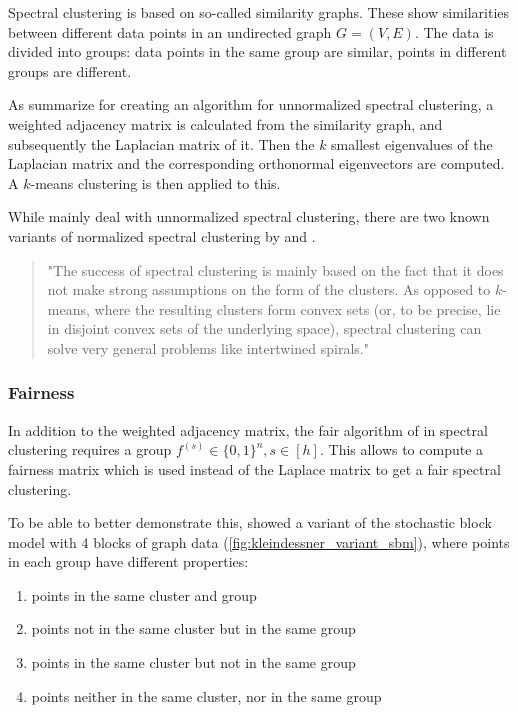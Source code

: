 Spectral clustering is based on so-called similarity graphs. These show similarities between different data points in an undirected graph $G = (V,E)$. The data is divided into groups: data points in the same group are similar, points in different groups are different. \autocite[2]{VonLuxburg2007}

As \textcite[2]{Kleindessner2019} summarize for creating an algorithm for unnormalized spectral clustering, a weighted adjacency matrix is calculated from the similarity graph, and subsequently the Laplacian matrix of it. Then the $k$ smallest eigenvalues of the Laplacian matrix and the corresponding orthonormal eigenvectors are computed. A $k$-means clustering is then applied to this.

While \textcite[]{Kleindessner2019} mainly deal with unnormalized spectral clustering, there are two known variants of normalized spectral clustering by \textcite[]{Shi2000} and \textcite[]{Ng2001}.

\begin{quote}
"The success of spectral clustering is mainly based on the fact that it does not make strong assumptions on the form of the clusters. As opposed to $k$-means, where the resulting clusters form convex sets (or, to be precise, lie in disjoint convex sets of the underlying space), spectral clustering can solve very general problems like intertwined spirals."
\autocite[28]{VonLuxburg2007}
\end{quote}

\subsubsection{Fairness}

In addition to the weighted adjacency matrix, the fair algorithm of \textcite[3]{Kleindessner2019} in spectral clustering requires a group $f^{(s)} \in \{0,1\}^n, s \in [h]$. This allows to compute a fairness matrix which is used instead of the Laplace matrix to get a fair spectral clustering. \autocite[3]{Kleindessner2019}

To be able to better demonstrate this, \textcite[4]{Kleindessner2019} showed a variant of the stochastic block model with 4 blocks of graph data (\ref{fig:kleindessner_variant_sbm}), where points in each group have different properties:
\begin{enumerate}
	\item points in the same cluster and group
	\item points not in the same cluster but in the same group
	\item points in the same cluster but not in the same group
	\item points neither in the same cluster, nor in the same group
\end{enumerate}

